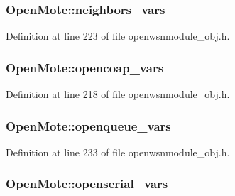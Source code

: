 \subsubsection[{\texorpdfstring{neighbors\+\_\+vars}{neighbors_vars}}]{ Open\+Mote\+::neighbors\+\_\+vars}\hypertarget{struct_open_mote_a6d24b1df68cebe6b4e30bf6606875e19}{}\label{struct_open_mote_a6d24b1df68cebe6b4e30bf6606875e19}


Definition at line 223 of file openwsnmodule\+\_\+obj.\+h.

\subsubsection[{\texorpdfstring{opencoap\+\_\+vars}{opencoap_vars}}]{ Open\+Mote\+::opencoap\+\_\+vars}\hypertarget{struct_open_mote_ab5bab0ddb3925a9e553328506c80c6ce}{}\label{struct_open_mote_ab5bab0ddb3925a9e553328506c80c6ce}


Definition at line 218 of file openwsnmodule\+\_\+obj.\+h.

\subsubsection[{\texorpdfstring{openqueue\+\_\+vars}{openqueue_vars}}]{ Open\+Mote\+::openqueue\+\_\+vars}\hypertarget{struct_open_mote_a386f53172313c33476c0fb5de4daf54e}{}\label{struct_open_mote_a386f53172313c33476c0fb5de4daf54e}


Definition at line 233 of file openwsnmodule\+\_\+obj.\+h.

\subsubsection[{\texorpdfstring{openserial\+\_\+vars}{openserial_vars}}]{ Open\+Mote\+::openserial\+\_\+vars}\hypertarget{struct_open_mote_afd8c3a10c7a45dd24412299494f22dfd}{}\label{struct_open_mote_afd8c3a10c7a45dd24412299494f22dfd}


